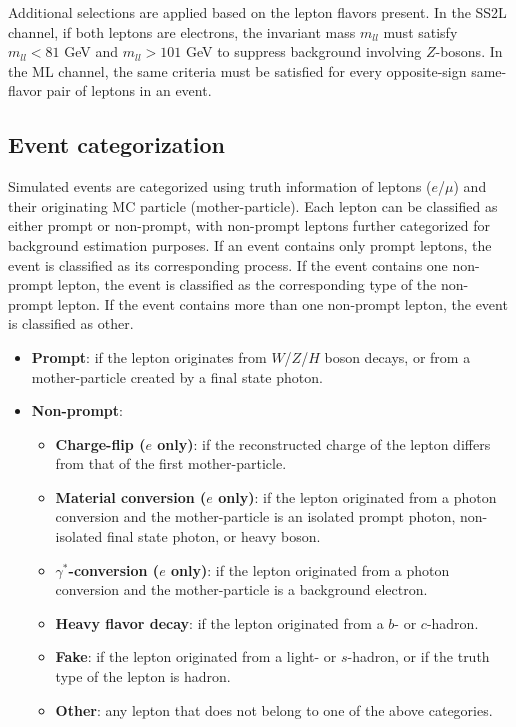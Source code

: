 \documentclass[../thesis.tex]{subfiles}
\begin{document}
Additional selections are applied based on the lepton flavors present. In the SS2L channel, if both leptons are electrons, the invariant mass $m_{ll}$ must satisfy $m_{ll}<81$ GeV and $m_{ll}>101$ GeV to suppress background involving $Z$-bosons. In the \acs{ML} channel, the same criteria must be satisfied for every opposite-sign same-flavor pair of leptons in an event.

\subsection{Event categorization}
Simulated events are categorized using truth information of leptons ($e$/$\mu$) and their originating \acs{MC} particle (mother-particle). Each lepton can be classified as either prompt or non-prompt, with non-prompt leptons further categorized for background estimation purposes. If an event contains only prompt leptons, the event is classified as its corresponding process. If the event contains one non-prompt lepton, the event is classified as the corresponding type of the non-prompt lepton. If the event contains more than one non-prompt lepton, the event is classified as other.

\begin{itemize}
\item \textbf{Prompt}: if the lepton originates from $W$/$Z$/$H$ boson decays, or from a mother-particle created by a final state photon.
\item \textbf{Non-prompt}:
	\begin{itemize}
	\item \textbf{Charge-flip ($e$ only)}: if the reconstructed charge of the lepton differs from that of the first mother-particle.
	\item \textbf{Material conversion ($e$ only)}: if the lepton originated from a photon conversion and the mother-particle is an isolated prompt photon, non-isolated final state photon, or heavy boson.
	\item \textbf{$\gamma^*$-conversion ($e$ only)}: if the lepton originated from a photon conversion and the mother-particle is a background electron.
	\item \textbf{Heavy flavor decay}: if the lepton originated from a $b$- or $c$-hadron.
	\item \textbf{Fake}: if the lepton originated from a light- or $s$-hadron, or if the truth type of the lepton is hadron.
	\item \textbf{Other}: any lepton that does not belong to one of the above categories.
	\end{itemize}
\end{itemize}
\end{document}
